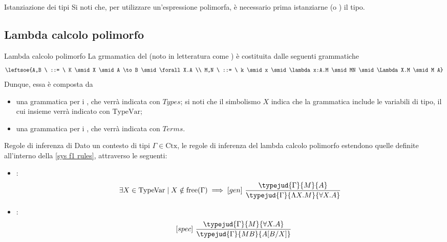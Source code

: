\documentclass[a4paper, 12pt]{report}
\begin{document}
    \begin{framedobs}{Istanziazione dei tipi}
        Si noti che, per utilizzare un'espressione polimorfa, è necessario prima istanziarne (o ) il tipo.
    \end{framedobs}

    \subsection{Lambda calcolo polimorfo}

    \begin{frameddefn}{Lambda calcolo polimorfo}
        La grmamatica del  (noto in letteratura come ) è costituita dalle seguenti grammatiche $$\leftsoe{A,B \ ::= \ K \smid X \smid A \to B \smid \forall X.A \\ M,N \ ::= \ k \smid x \smid \lambda x:A.M \smid MN \smid \Lambda X.M \smid M A}$$ Dunque, essa è composta da
        \begin{itemize}
            \item una grammatica per i , che verrà indicata con $Types$; si noti che il simbolismo $X$ indica che la grammatica include le variabili di tipo, il cui insieme verrà indicato con $\mathrm{TypeVar}$;
            \item una grammatica per i , che verrà indicata con $Terms$.
        \end{itemize}
    \end{frameddefn}

    \begin{framedprop}[label={regole system F}]{Regole di inferenza di }
        Dato un contesto di tipi $\Gamma \in \mathrm{Ctx}$, le regole di inferenza del lambda calcolo polimorfo estendono quelle definite all'interno della \cref{sys f1 rules}, attraverso le seguenti:

        \begin{itemize}
            \item {}: $$\exists X \in \mathrm{TypeVar} \mid X \notin \mathrm{free}(\Gamma) \implies [gen] \ \dfrac{\typejud{\Gamma}{M}{A}}{\typejud{\Gamma}{\Lambda X.M}{\forall X.A}}$$
            \item {}: $$\quad [spec] \ \dfrac{\typejud{\Gamma}{M}{\forall X.A}}{\typejud{\Gamma}{MB}{A[B/X]}}$$
        \end{itemize}
    \end{framedprop}
\end{document}
